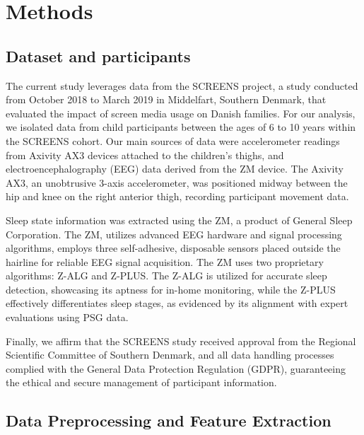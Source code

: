 \documentclass[
  super,
  preprint,
  3p]{elsarticle}
\begin{document}
\hypertarget{methods}{%
\section{Methods}\label{methods}}

\hypertarget{dataset-and-participants}{%
\subsection{Dataset and participants}\label{dataset-and-participants}}

The current study leverages data from the SCREENS
project\citep{rasmussen2020}, a study conducted from October 2018 to
March 2019 in Middelfart, Southern Denmark, that evaluated the impact of
screen media usage on Danish families. For our analysis, we isolated
data from child participants between the ages of 6 to 10 years within
the SCREENS cohort. Our main sources of data were accelerometer readings
from Axivity AX3 devices attached to the children's thighs, and
electroencephalography (EEG) data derived from the ZM device. The
Axivity AX3, an unobtrusive 3-axis accelerometer, was positioned midway
between the hip and knee on the right anterior thigh, recording
participant movement data.

Sleep state information was extracted using the ZM, a product of General
Sleep Corporation. The ZM, utilizes advanced EEG hardware and signal
processing algorithms, employs three self-adhesive, disposable sensors
placed outside the hairline for reliable EEG signal acquisition. The ZM
uses two proprietary algorithms: Z-ALG and Z-PLUS. The Z-ALG is utilized
for accurate sleep detection, showcasing its aptness for in-home
monitoring\citep{kaplan2014}, while the Z-PLUS effectively
differentiates sleep stages, as evidenced by its alignment with expert
evaluations using PSG data\citep{wang2015}.

Finally, we affirm that the SCREENS study received approval from the
Regional Scientific Committee of Southern Denmark, and all data handling
processes complied with the General Data Protection Regulation (GDPR),
guaranteeing the ethical and secure management of participant
information.

\hypertarget{data-preprocessing-and-feature-extraction}{%
\subsection{Data Preprocessing and Feature
Extraction}\label{data-preprocessing-and-feature-extraction}}
\end{document}
